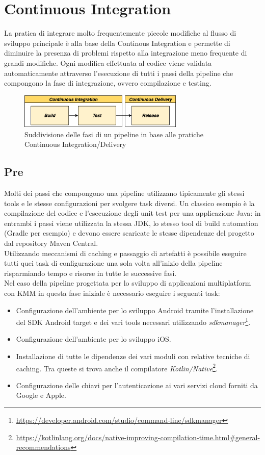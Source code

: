 \section{Continuous Integration}
La pratica di integrare molto frequentemente piccole modifiche al flusso di sviluppo principale è alla base della Continous Integration e permette di diminuire la presenza di problemi rispetto alla integrazione meno frequente di grandi modifiche. Ogni modifica effettuata al codice viene validata automaticamente attraverso l'esecuzione di tutti i passi della pipeline che compongono la fase di integrazione, ovvero compilazione e testing.

\begin{figure}[H]
\centering
\includegraphics[width=0.7\textwidth]{img/tesi-29-cicd.drawio.png}
\caption{Suddivisione delle fasi di un pipeline in base alle pratiche Continuous Integration/Delivery}
\end{figure}

\subsection{Pre}
Molti dei passi che compongono una pipeline utilizzano tipicamente gli stessi tools e le stesse configurazioni per svolgere task diversi. Un classico esempio è la compilazione del codice e l'esecuzione degli unit test per una applicazione Java: in entrambi i passi viene utilizzata la stessa JDK, lo stesso tool di build automation (Gradle per esempio) e devono essere scaricate le stesse dipendenze del progetto dal repository Maven Central.\\
Utilizzando meccanismi di caching e passaggio di artefatti è possibile eseguire tutti quei task di configurazione una sola volta all'inizio della pipeline risparmiando tempo e risorse in tutte le successive fasi.\\
Nel caso della pipeline progettata per lo sviluppo di applicazioni multiplatform con KMM in questa fase iniziale è necessario eseguire i seguenti task:
\begin{itemize}
    \item Configurazione dell'ambiente per lo sviluppo Android tramite l'installazione del SDK Android target e dei vari tools necessari utilizzando \textit{sdkmanager}\footnote{\url{https://developer.android.com/studio/command-line/sdkmanager}}.
    \item Configurazione dell'ambiente per lo sviluppo iOS.
    \item Installazione di tutte le dipendenze dei vari moduli con relative tecniche di caching. Tra queste si trova anche il compilatore \textit{Kotlin/Native}\footnote{\url{https://kotlinlang.org/docs/native-improving-compilation-time.html\#general-recommendations}}.
    \item Configurazione delle chiavi per l'autenticazione ai vari servizi cloud forniti da Google e Apple.
\end{itemize}

